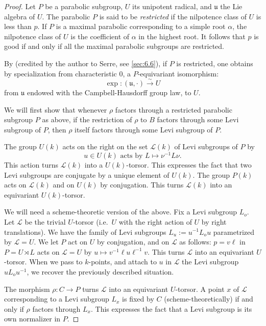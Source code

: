 \documentclass[11pt,a4paper]{article}
\theoremstyle{plain}
\theoremstyle{definition}
\begin{document}
\begin{proof}
Let $P$ be a parabolic subgroup, $U$ its unipotent radical, and $\mathfrak{u}$ the Lie algebra of $U$. The parabolic $P$ is said to be \emph{restricted} if the nilpotence class of $U$ is less than $p$. If $P$ is a maximal parabolic corresponding to a simple root $\alpha$, the nilpotence class of $U$ is the coefficient of $\alpha$ in the highest root. It follows that $p$ is good if and only if all the maximal parabolic subgroups are restricted.

By \cite[Proposition~5.3]{Sei} (credited by the author to Serre, see \ref{sec:6.6}), if $P$ is restricted, one obtains by specialization from characteristic $0$, a $P$-equivariant isomorphism:
\begin{equation} \label{eq:4.2.2}
\exp : (\mathfrak{u}, \cdot) \xrightarrow{\sim} U
\end{equation}
from $\mathfrak{u}$ endowed with the Campbell-Hausdorff group law, to $U$.

We will first show that whenever $\rho$ factors through a restricted parabolic subgroup $P$ as above, if the restriction of $\rho$ to $B$ factors through some Levi subgroup of $P$, then $\rho$ itself factors through some Levi subgroup of $P$.

The group $U(k)$ acts on the right on the set $\mathcal{L}(k)$ of Levi subgroups of $P$ by
\[
u \in U(k) \text{ acts by } L \mapsto \nu^{-1} L \nu.
\]
This action turns $\mathcal{L}(k)$ into a $U(k)$-torsor. This expresses the fact that two Levi subgroups are conjugate by a unique element of $U(k)$. The group $P(k)$ acts on $\mathcal{L}(k)$ and on $U(k)$ by conjugation. This turns $\mathcal{L}(k)$ into an equivariant $U(k)$-torsor.

We will need a scheme-theoretic version of the above. Fix a Levi subgroup $L_o$. Let $\mathcal{L}$ be the trivial $U$-torsor (i.e.~$U$ with the right action of $U$ by right translations). We have the family of Levi subgroups $L_u := u^{-1} L_o u$ parametrized by $\mathcal{L} = U$. We let $P$ act on $U$ by conjugation, and on $\mathcal{L}$ as follows: $p = v\ell$ in $P = U \rtimes L$ acts on $\mathcal{L} = U$ by $u \mapsto v^{-1} \ell u \ell^{-1} v$. This turns $\mathcal{L}$ into an equivariant $U$-torsor. When we pass to $k$-points, and attach to $u$ in $\mathcal{L}$ the Levi subgroup $u L_o u^{-1}$, we recover the previously described situation.

The morphism $\rho : C \to P$ turns $\mathcal{L}$ into an equivariant $U$-torsor. A point $x$ of $\mathcal{L}$ corresponding to a Levi subgroup $L_x$ is fixed by $C$ (scheme-theoretically) if and only if $\rho$ factors through $L_x$. This expresses the fact that a Levi subgroup is its own normalizer in $P$.


\end{proof}
\end{document}
